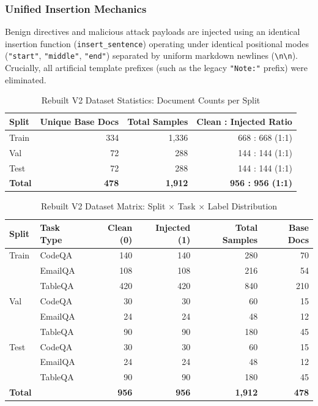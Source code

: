 \documentclass[10pt,conference]{IEEEtran}
\begin{document}
\subsubsection{Unified Insertion Mechanics}
Benign directives and malicious attack payloads are injected using an identical insertion function (\texttt{insert\_sentence}) operating under identical positional modes (\texttt{"start"}, \texttt{"middle"}, \texttt{"end"}) separated by uniform markdown newlines (\texttt{\textbackslash n\textbackslash n}). Crucially, all artificial template prefixes (such as the legacy \texttt{"Note:"} prefix) were eliminated.

\begin{table}[t]
\centering
\caption{Rebuilt V2 Dataset Statistics: Document Counts per Split}
\label{tab:doc_counts}
\begin{tabular}{lrrr}
\toprule
\textbf{Split} & \textbf{Unique Base Docs} & \textbf{Total Samples} & \textbf{Clean : Injected Ratio} \\
\midrule
Train & 334 & 1,336 & 668 : 668 (1:1) \\
Val   &  72 &   288 & 144 : 144 (1:1) \\
Test  &  72 &   288 & 144 : 144 (1:1) \\
\midrule
\textbf{Total} & \textbf{478} & \textbf{1,912} & \textbf{956 : 956 (1:1)} \\
\bottomrule
\end{tabular}
\end{table}

\begin{table}[t]
\centering
\caption{Rebuilt V2 Dataset Matrix: Split $\times$ Task $\times$ Label Distribution}
\label{tab:split_task_matrix}
\begin{tabular}{llrrrr}
\toprule
\textbf{Split} & \textbf{Task Type} & \textbf{Clean (0)} & \textbf{Injected (1)} & \textbf{Total Samples} & \textbf{Base Docs} \\
\midrule
Train & CodeQA  & 140 & 140 & 280 &  70 \\
      & EmailQA & 108 & 108 & 216 &  54 \\
      & TableQA & 420 & 420 & 840 & 210 \\
\midrule
Val   & CodeQA  &  30 &  30 &  60 &  15 \\
      & EmailQA &  24 &  24 &  48 &  12 \\
      & TableQA &  90 &  90 & 180 &  45 \\
\midrule
Test  & CodeQA  &  30 &  30 &  60 &  15 \\
      & EmailQA &  24 &  24 &  48 &  12 \\
      & TableQA &  90 &  90 & 180 &  45 \\
\midrule
\textbf{Total} & & \textbf{956} & \textbf{956} & \textbf{1,912} & \textbf{478} \\
\bottomrule
\end{tabular}
\end{table}
\end{document}
